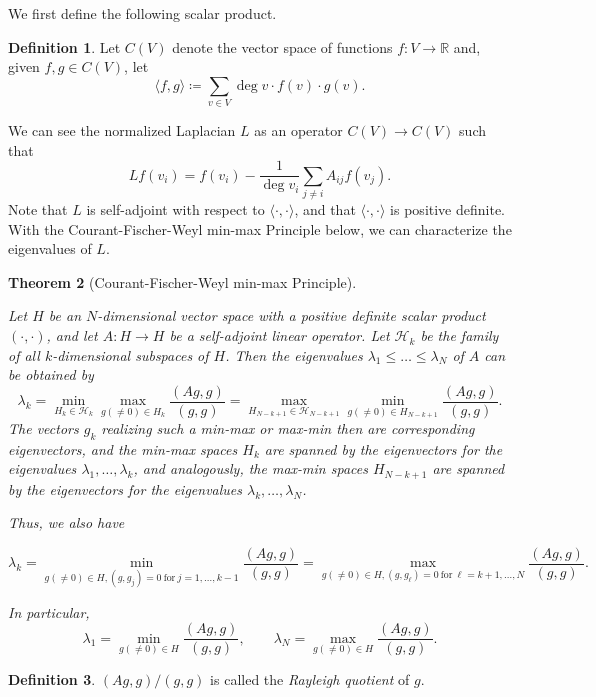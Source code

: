 \documentclass{article}
\theoremstyle{plain}
\newtheorem{theorem}{Theorem}[section]
\theoremstyle{definition}
\newtheorem{definition}[theorem]{Definition}
\theoremstyle{remark}
\begin{document}
We first define the following scalar product.
\begin{definition}
    Let $C(V)$ denote the vector space of functions $f:V\rightarrow\mathbb{R}$ and, given $f,g\in C(V)$, let
	\begin{equation*}
	\langle f,g\rangle\coloneqq\sum_{v\in V}\deg v\cdot f(v)\cdot g(v).
	\end{equation*}
\end{definition}
We can see the normalized Laplacian $L$ as an operator $C(V)\rightarrow C(V)$ such that
\begin{equation}\label{eq:Lf}
    Lf(v_i)=f(v_i)-\frac{1}{\deg v_i}\sum_{j\neq i}A_{ij}f(v_j).
\end{equation}
Note that $L$ is self-adjoint with respect to $\langle \cdot, \cdot\rangle$, and that $\langle \cdot, \cdot \rangle$ is positive definite.\\

With the Courant-Fischer-Weyl min-max Principle below, we can characterize the eigenvalues of $L$.

\begin{theorem}[Courant-Fischer-Weyl min-max Principle]
\label{min-max theorem}

Let $H$ be an $N$-dimensional vector space with a positive definite scalar product $(\cdot,\cdot)$, and let $A\colon H\rightarrow H$ be a self-adjoint linear operator. Let $\mathcal{H}_{k}$  be the  family of all $k$-dimensional subspaces of $H$.
  Then the eigenvalues $\lambda_{1}\leq \ldots \leq \lambda_{N}$ of
$A$ can be obtained by 
\begin{equation}
\label{min-max}
\lambda_{k}=\min_{H_k\in \mathcal{H}_{k}}\max_{g(\neq 0)\in H_{k}}\frac{(Ag,g)}{(g,g)}=\max_{{H}_{N-k+1} \in \mathcal{H}_{N-k+1}}\min_{g(\neq 0)\in {H}_{N-k+1}}\frac{(Ag,g)}{(g,g)}.
\end{equation}
The vectors $g_k$ realizing such a min-max or max-min then are corresponding
eigenvectors, and the min-max spaces $H_{k}$ are spanned
by the eigenvectors for the eigenvalues $\lambda_1,\dots
,\lambda_k$, and analogously, the max-min spaces $H_{N-k+1}$ are spanned
by the eigenvectors for the eigenvalues $\lambda_k, \dots, \lambda_N$.

Thus, we also have

\begin{equation}
\label{min-max1}
\lambda_{k}=\min_{g(\neq 0)\in H, (g,g_j)=0\ \mathrm{ for }\ j=1,\dots ,k-1}\frac{(Ag,g)}{(g,g)}=\max_{g(\neq 0)\in H, (g,g_\ell)=0\ \mathrm{ for }\ \ell=k+1,\dots ,N}\frac{(Ag,g)}{(g,g)}.
\end{equation}

In particular, 
\begin{equation}
\label{min-max2}
\lambda_{1}=\min_{g(\neq 0)\in H}\frac{(Ag,g)}{(g,g)},\qquad \lambda_N=\max_{g(\neq 0)\in H}\frac{(Ag,g)}{(g,g)}.
\end{equation}
\end{theorem}
\begin{definition}\label{RQ}
$(Ag,g)/(g,g)$ is called the \emph{Rayleigh quotient} of $g$. 
\end{definition}
\end{document}
